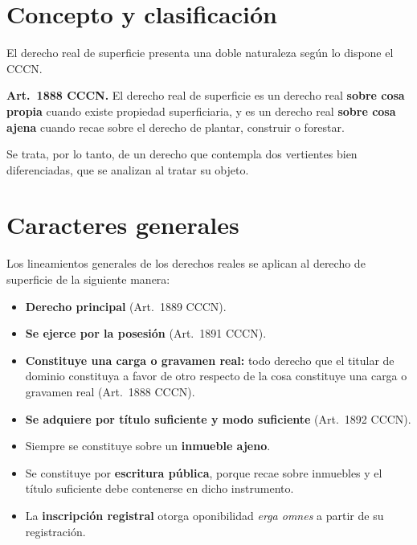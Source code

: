 \documentclass[12pt,oneside]{book}
\begin{document}
\section{Concepto y clasificación}

El derecho real de superficie presenta una doble naturaleza según lo dispone el CCCN.

\begin{important}
\textbf{Art.~1888 CCCN.} El derecho real de superficie es un derecho real \textbf{sobre cosa propia} cuando existe propiedad superficiaria, y es un derecho real \textbf{sobre cosa ajena} cuando recae sobre el derecho de plantar, construir o forestar.
\end{important}

Se trata, por lo tanto, de un derecho que contempla dos vertientes bien diferenciadas, que se analizan al tratar su objeto.

\section{Caracteres generales}

Los lineamientos generales de los derechos reales se aplican al derecho de superficie de la siguiente manera:

\begin{itemize}
    \item \textbf{Derecho principal} (Art.~1889 CCCN).
    \item \textbf{Se ejerce por la posesión} (Art.~1891 CCCN).
    \item \textbf{Constituye una carga o gravamen real:} todo derecho que el titular de dominio constituya a favor de otro respecto de la cosa constituye una carga o gravamen real (Art.~1888 CCCN).
    \item \textbf{Se adquiere por título suficiente y modo suficiente} (Art.~1892 CCCN).
    \item Siempre se constituye sobre un \textbf{inmueble ajeno}.
    \item Se constituye por \textbf{escritura pública}, porque recae sobre inmuebles y el título suficiente debe contenerse en dicho instrumento.
    \item La \textbf{inscripción registral} otorga oponibilidad \textit{erga omnes} a partir de su registración.
\end{itemize}
\end{document}

